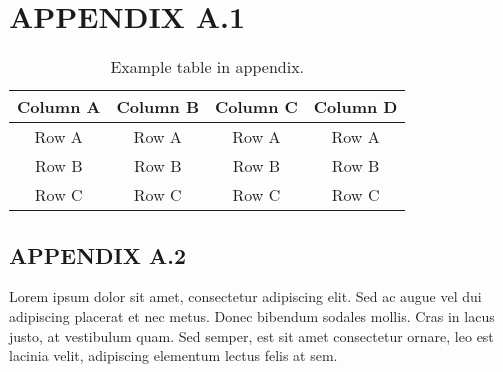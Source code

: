 \chapter{APPENDIX A.1}

\begin{table*}[!ht]
	{\setlength{\tabcolsep}{14pt}
		\caption{Example table in appendix.}
		\begin{center}
			\vspace{-6mm}
			\begin{tabular}{cccc}
				\hline\hline
				Column A & Column B & Column C & Column D \\
				\hline
				Row A & Row A & Row A & Row A \\
				Row B & Row B & Row B & Row B \\
				Row C & Row C & Row C & Row C \\
				\hline
			\end{tabular}
			\vspace{-6mm}
		\end{center}
		\label{tableappendix}}
\end{table*}

\section*{APPENDIX A.2}

Lorem ipsum dolor sit amet, consectetur adipiscing elit. Sed ac augue vel dui 
adipiscing placerat et nec metus. Donec bibendum sodales mollis. Cras in lacus 
justo, at vestibulum quam. Sed semper, est sit amet consectetur ornare, leo est 
lacinia velit, adipiscing elementum lectus felis at sem.

\newpage







